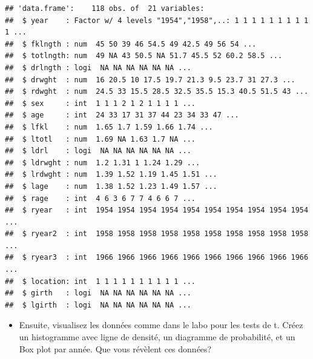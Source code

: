\documentclass[12pt,]{book}
\newenvironment{Shaded}{\begin{snugshade}}{\end{snugshade}}
\newcommand{\KeywordTok}[1]{\textcolor[rgb]{0.27,0.27,0.27}{\textbf{#1}}}
\newcommand{\NormalTok}[1]{#1}
\newcommand{\OperatorTok}[1]{\textcolor[rgb]{0.43,0.43,0.43}{\textbf{#1}}}
\newcommand{\StringTok}[1]{\textcolor[rgb]{0.5,0.5,0.5}{#1}}
\providecommand{\tightlist}{%
  \setlength{\itemsep}{0pt}\setlength{\parskip}{0pt}}
\begin{document}
\begin{Shaded}
\end{Shaded}

\begin{verbatim}
## 'data.frame':	118 obs. of  21 variables:
##  $ year    : Factor w/ 4 levels "1954","1958",..: 1 1 1 1 1 1 1 1 1 1 ...
##  $ fklngth : num  45 50 39 46 54.5 49 42.5 49 56 54 ...
##  $ totlngth: num  49 NA 43 50.5 NA 51.7 45.5 52 60.2 58.5 ...
##  $ drlngth : logi  NA NA NA NA NA NA ...
##  $ drwght  : num  16 20.5 10 17.5 19.7 21.3 9.5 23.7 31 27.3 ...
##  $ rdwght  : num  24.5 33 15.5 28.5 32.5 35.5 15.3 40.5 51.5 43 ...
##  $ sex     : int  1 1 1 2 1 2 1 1 1 1 ...
##  $ age     : int  24 33 17 31 37 44 23 34 33 47 ...
##  $ lfkl    : num  1.65 1.7 1.59 1.66 1.74 ...
##  $ ltotl   : num  1.69 NA 1.63 1.7 NA ...
##  $ ldrl    : logi  NA NA NA NA NA NA ...
##  $ ldrwght : num  1.2 1.31 1 1.24 1.29 ...
##  $ lrdwght : num  1.39 1.52 1.19 1.45 1.51 ...
##  $ lage    : num  1.38 1.52 1.23 1.49 1.57 ...
##  $ rage    : int  4 6 3 6 7 7 4 6 6 7 ...
##  $ ryear   : int  1954 1954 1954 1954 1954 1954 1954 1954 1954 1954 ...
##  $ ryear2  : int  1958 1958 1958 1958 1958 1958 1958 1958 1958 1958 ...
##  $ ryear3  : int  1966 1966 1966 1966 1966 1966 1966 1966 1966 1966 ...
##  $ location: int  1 1 1 1 1 1 1 1 1 1 ...
##  $ girth   : logi  NA NA NA NA NA NA ...
##  $ lgirth  : logi  NA NA NA NA NA NA ...
\end{verbatim}

\begin{itemize}
\tightlist
\item
  Ensuite, visualisez les données comme dans le labo pour les tests de t. Créez un histogramme avec ligne de densité, un diagramme de probabilité, et un Box plot par année. Que vous révèlent ces données?
\end{itemize}
\end{document}
